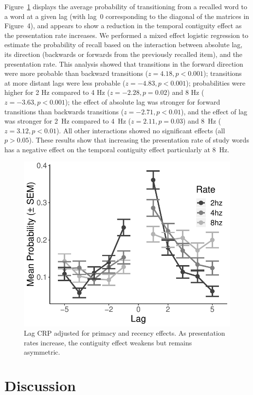 \documentclass[10pt,letterpaper]{article}
\begin{document}
Figure~\ref{CRP} displays the average probability of transitioning from a
recalled word to a word at a given lag (with lag~0 corresponding to
the diagonal of the matrices in Figure~4), and appears to show a reduction in
the temporal contiguity effect as the presentation rate increases. We
performed a mixed effect logistic regression to estimate the probability of
recall based on the interaction between absolute lag, its direction (backwards
or forwards from the previously recalled item), and the presentation rate.
This analysis showed that transitions in the forward direction were more
probable than backward transitions ($z = 4.18, p<0.001$); transitions at more
distant lags were less probable ($z=-4.83, p<0.001$); probabilities were
higher for 2 Hz compared to
4 Hz ($z=-2.28, p=0.02$) and 8 Hz ($z=-3.63, p<0.001$); the effect of absolute
lag was stronger for forward transitions than backwards transitions ($z=-2.71,
p<0.01$), and the effect of lag was stronger for 2~Hz compared to 4~Hz
($z=2.11, p=0.03$) and 8~Hz ($z=3.12, p<0.01$). All other interactions showed
no significant effects (all $p>0.05$). These results show that increasing the
presentation rate of study words has a negative effect on the temporal
contiguity effect particularly at 8~Hz.

\begin{figure}
\begin{center}
\includegraphics[width = .4\textwidth]{CRP_adjusted.pdf}
\end{center}
\caption{Lag CRP adjusted for primacy and recency effects. As presentation rates increase, the contiguity effect weakens but remains asymmetric.} 
\label{CRP}
\end{figure}


\section{Discussion}
\end{document}
